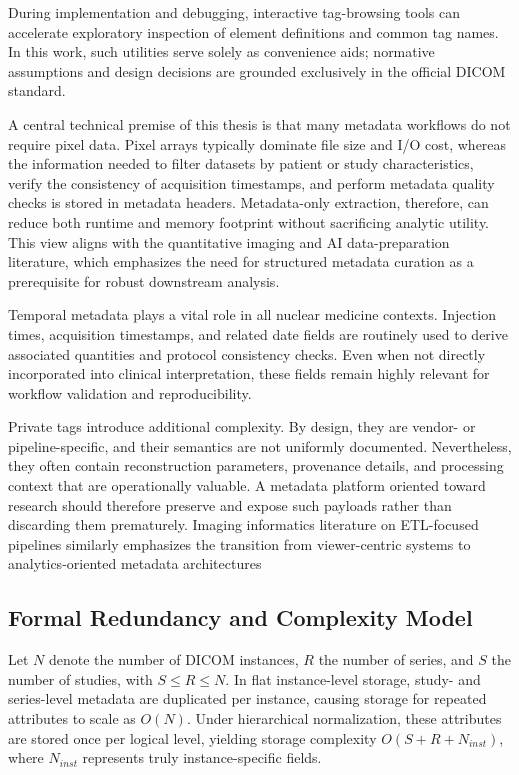 During implementation and debugging, interactive tag-browsing tools can accelerate exploratory inspection of element definitions and common tag names\cite{dicomlookup}. In this work, such utilities serve solely as convenience aids; normative assumptions and design decisions are grounded exclusively in the official DICOM standard\cite{dicom}.

A central technical premise of this thesis is that many metadata workflows do not require pixel data. Pixel arrays typically dominate file size and I/O cost, whereas the information needed to filter datasets by patient or study characteristics, verify the consistency of acquisition timestamps, and perform metadata quality checks is stored in metadata headers. Metadata-only extraction, therefore, can reduce both runtime and memory footprint without sacrificing analytic utility. This view aligns with the quantitative imaging and AI data-preparation literature, which emphasizes the need for structured metadata curation as a prerequisite for robust downstream analysis\cite{fedorov_qin, DIAZ202125}.

Temporal metadata plays a vital role in all nuclear medicine contexts. Injection times, acquisition timestamps, and related date fields are routinely used to derive associated quantities and protocol consistency checks. Even when not directly incorporated into clinical interpretation, these fields remain highly relevant for workflow validation and reproducibility.

Private tags introduce additional complexity. By design, they are vendor- or pipeline-specific, and their semantics are not uniformly documented. Nevertheless, they often contain reconstruction parameters, provenance details, and processing context that are operationally valuable. A metadata platform oriented toward research should therefore preserve and expose such payloads rather than discarding them prematurely. Imaging informatics literature on ETL-focused pipelines similarly emphasizes the transition from viewer-centric systems to analytics-oriented metadata architectures\cite{software1020009} 

\subsection{Formal Redundancy and Complexity Model}

Let \(N\) denote the number of DICOM instances, \(R\) the number of series, and \(S\) the number of studies, with \(S \le R \le N\). In flat instance-level storage, study- and series-level metadata are duplicated per instance, causing storage for repeated attributes to scale as \(O(N)\). Under hierarchical normalization, these attributes are stored once per logical level, yielding storage complexity \(O(S+R+N_{inst})\), where \(N_{inst}\) represents truly instance-specific fields.

